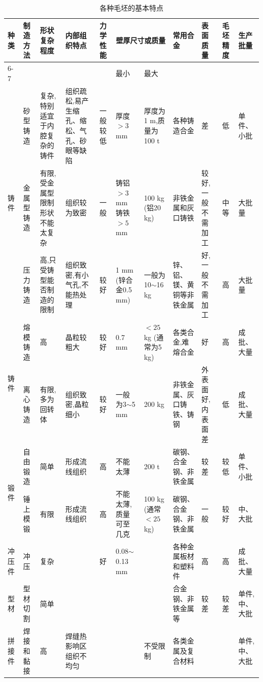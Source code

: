 \documentclass[UTF8]{ctexbook}
\newcommand{\◎}{\ensuremath{\bigcirc}}
\begin{document}
\begin{table}[H]
\centering
\caption{各种毛坯的基本特点}
\footnotesize\setlength{\tabcolsep}{2pt}
\begin{tabular}{|p{0.8cm}|p{1.5cm}|p{1.8cm}|p{2.2cm}|p{1.2cm}|p{1.5cm}|p{1.2cm}|p{1.5cm}|p{1.2cm}|p{0.8cm}|p{1.2cm}|}
\hline
\multirow{2}{*}{种类} & \multirow{2}{*}{制造方法} & \multirow{2}{*}{形状复杂程度} & \multirow{2}{*}{内部组织特点} & \multirow{2}{*}{力学性能} & \multicolumn{2}{c|}{壁厚尺寸或质量} & \multirow{2}{*}{常用合金} & \multirow{2}{*}{表面质量} & \multirow{2}{*}{毛坯精度} & \multirow{2}{*}{生产批量} \\
\cline{6-7}
 & & & & & 最小 & 最大 & & & & \\
\hline
\multirow{3}{*}{铸件} & 砂型铸造 & 复杂,特别适宜于内腔复杂的铸件 & 组织疏松,易产生缩孔、缩松、气孔、砂眼等缺陷 & 一般较低 & 厚度$>3$ mm & 厚度为1 m,质量为100 t & 各种铸造合金 & 差 & 低 & 单件、小批 \\
\cline{2-10}
 & 金属型铸造 & 有限,受金属型限制形状不能太复杂 & 组织较为致密 & 一般 & 铸铝$>3$ mm 铸铁$>5$ mm & 100 kg (铝20 kg) & 非铁金属和灰口铸铁 & 较好,一般不需加工 & 中等 & 大批量 \\
\cline{2-10}
 & 压力铸造 & 高,只受铸型能否制造的限制 & 组织致密,有小气孔,不能热处理 & 较好 & 1 mm (锌合金0.5 mm) & 一般为10$\sim$16 kg & 锌、铝、镁、黄铜等非铁金属 & 好,一般不需加工 & 高 & 大批量 \\
\hline
\multirow{2}{*}{铸件} & 熔模铸造 & 高 & 晶粒较粗大 & 较好 & 0.7 mm & $<25$ kg (通常为5 kg) & 各类合金,难熔合金 & 好 & 高 & 成批、大量 \\
\cline{2-10}
 & 离心铸造 & 有限,多为回转体 & 组织致密,晶粒细小 & 较好 & 一般为3$\sim$5 mm & 200 kg & 非铁金属、灰口铸铁、铸钢 & 外表面好,内表面差 & 低 & 成批、大量 \\
\hline
\multirow{2}{*}{锻件} & 自由锻造 & 简单 & 形成流线组织 & 高 & 不能太薄 & 200 t & 碳钢、合金钢、非铁金属 & 较差 & 较低 & 单件、小批 \\
\cline{2-10}
 & 锤上模锻 & 有限 & 形成流线组织 & 高 & 不能太薄,质量可至几克 & 100 kg (通常$<25$ kg) & 碳钢、合金钢、非铁金属 & 一般 & 较好 & 中、大批 \\
\hline
冲压件 & 冲压 & 复杂 & & 好 & 0.08$\sim$0.13 mm & & 各种金属板材和塑料件 & 高 & 高 & 成批、大量 \\
\hline
型材 & 型材切割 & 简单 & & & & & 合金钢、非铁金属等 & 较差 & 较差 & 单件,中、大批 \\
\hline
拼接件 & 焊接和黏接 & 高 & 焊缝热影响区组织不均匀 & & & 不受限制 & 各类金属及复合材料 & & & 单件,中、大批 \\
\hline
\end{tabular}\end{table}
\end{document}

